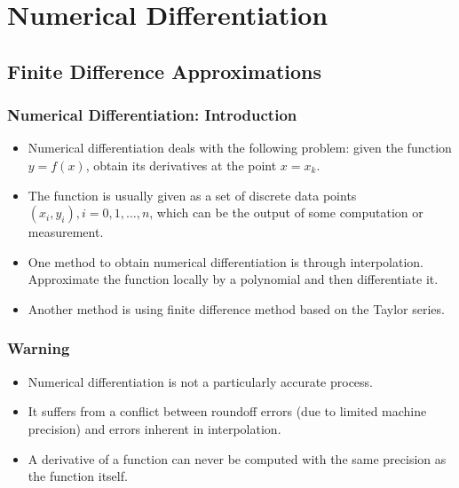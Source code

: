 \documentclass{beamer}
\begin{document}
\section[Numerical Differentiation]{Numerical Differentiation}
\subsection[Finite Difference Approximations]{Finite Difference Approximations}
\begin{frame}[fragile]
\frametitle{Numerical Differentiation: Introduction}
\begin{itemize}
\item Numerical differentiation deals with the following problem: given the function $y= f(x)$, obtain its derivatives at the point $x=x_k$.
\item The function is  usually given as a set of discrete data points $(x_i, y_i), i = 0,1,\ldots, n$, which can be the output of some computation or measurement.
\item One method to obtain numerical differentiation is through \alert{interpolation}. Approximate the function locally by a \alert{polynomial} and then differentiate it.
\item Another method is using \alert{finite difference} method based on  the Taylor series. 
\end{itemize}



\end{frame}

\begin{frame}[fragile]
\frametitle{Warning}
\begin{itemize}

\item Numerical differentiation is \alert{not} a particularly accurate process.
\item It suffers from  a conflict between \alert{ roundoff errors} (due to limited machine precision) and \alert{errors inherent in interpolation}. 
\item A derivative of a function can \alert{never} be computed with the same precision as the function itself.
\end{itemize}
\end{frame}
\end{document}
